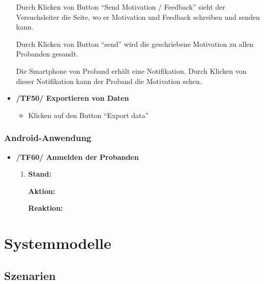 \documentclass[a4paper]{scrreprt}
\begin{document}
\begin{itemize}
                    \par Durch Klicken von Button ``Send Motivation / Feedback'' sieht der Versuchsleiter die Seite, wo er Motivation und Feedback schreiben und senden kann.
                    \par Durch Klicken von Button ``send'' wird die geschriebene Motivation zu allen Probanden gesandt.
                    \par Die Smartphone von Proband erh\"alt eine Notifikation. Durch Klicken von dieser Notifikation kann der Proband die Motivation sehen.

                \item \textbf{/TF50/ Exportieren von Daten}
                \begin{itemize}
                	\item Klicken auf den Button ``Export data''
                \end{itemize}


            \end{itemize}


        \vspace*{2cm}
        \subsection{Android-Anwendung}

			\begin{itemize}

            \item \textbf{/TF60/ Anmelden der Probanden}
            \begin{enumerate}
            	\item \par \textbf{Stand: } 
            	\par \textbf{Aktion: }
            	\par \textbf{Reaktion: }
            \end{enumerate}
        
		    \end{itemize}

    \chapter{Systemmodelle}

        \section{Szenarien}
\end{document}

